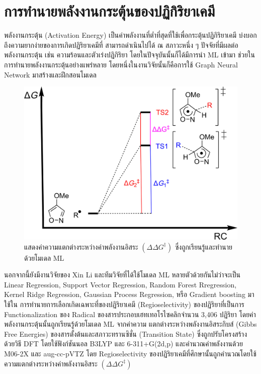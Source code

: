 \section{การทำนายพลังงานกระตุ้นของปฏิกิริยาเคมี}
\label{sec:pred_act_ener}

พลังงานกระตุ้น (Activation Energy) เป็นค่าพลังงานที่ต่ำที่สุดที่ใช้เพื่อกระตุ้นปฏิกิริยาเคมี บ่งบอกถึงความยากง่ายของการเกิดปฏิริยาเคมีที่%
สามารถดำเนินไปได้ ณ สภาวะหนึ่ง ๆ ปัจจัยที่มีผลต่อพลังงานกระตุ้น เช่น ความร้อนและตัวเร่งปฏิกิริยา โดยในปัจจุบันนั้นก็ได้มีการนำ ML เข้ามา%
ช่วยในการทำนายพลังงานกระตุ้นอย่างแพร่หลาย\autocite{lewis-atwell2022} โดยหนึ่งในงานวิจัยนั้นก็คือการใช้ Graph Neural Network 
มาสร้างและฝึกสอนโมเดล\autocite{grambow2020}

\begin{figure}[H]
    \centering
    \includegraphics[width=0.9\linewidth]{fig/ml_act_energy_regio.jpg}
    \caption{แสดงค่าความแตกต่างระหว่างค่าพลังงานอิสระ $(\Delta\Delta G^{\ddagger})$ ซึ่งถูกเรียนรู้และทำนายด้วยโมเดล ML}
    \label{fig:ml_act_energy_regio}
\end{figure}

นอกจากนี้ยังมีงานวิจัยของ Xin Li และทีมวิจัยที่ได้ใช้โมเดล ML หลายตัวด้วยกันไม่ว่าจะเป็น Linear Regression, Support Vector Regression, 
Random Forest Rregression, Kernel Ridge Regression, Gaussian Process Regression, หรือ Gradient boosting มาใช้ใน%
การทำนายการเลือกเกิดเฉพาะที่ของปฏิริยาเคมี (Regioselectivity) ของปฏิริยาที่เป็นการ Functionalization ของ  Radical 
ของสารประกอบเฮทเทอโรไซคลิกจำนวน 3,406 ปฏิริยา\autocite{li2020} โดยค่าพลังงานกระตุ้นนั้นถูกเรียนรู้ด้วยโมเดล ML จากค่าความ%
แตกต่างระหว่างพลังงานอิสระกิบส์ (Gibbs Free Energies) ของสารตั้งต้นและสภาวะทรานซิชั่น (Transition State) ซึ่งถูกปรับโครงสร้าง%
ด้วยวิธี DFT โดยใช้ฟังก์ชันนอล B3LYP และ 6-311+G(2d,p) และคำนวณค่าพลังงานด้วย M06-2X และ aug-cc-pVTZ โดย Regioselectivity
ของปฏิริยาเคมีที่ศึกษานั้นถูกคำนวณโดยใช้ความแตกต่างระหว่างค่าพลังงานอิสระ $(\Delta\Delta G^{\ddagger})$

